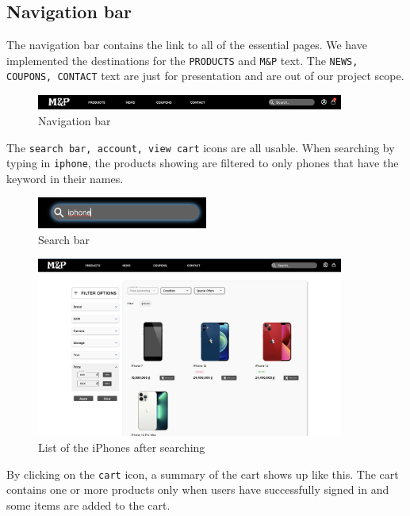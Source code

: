 \documentclass[a4paper]{article}
\numberwithin{equation}{section}
\begin{document}
\subsection{Navigation bar}

The navigation bar contains the link to all of the essential pages.
We have implemented the destinations for the {\tt PRODUCTS} and {\tt M\&P} text.
The {\tt NEWS, COUPONS, CONTACT} text are just for presentation and are out of our project scope.

\begin{figure}[H]
  \centering
  \includegraphics[width=0.9\textwidth]{assets/flow/navbar.png}
  \caption{Navigation bar}
\end{figure}

The {\tt search bar, account, view cart} icons are all usable.
When searching by typing in {\tt iphone}, the products showing are filtered to only phones that have the keyword in their names.
\begin{figure}[H]
  \centering
  \includegraphics[width=0.5\textwidth]{assets/flow/search.png}
  \caption{Search bar}
\end{figure}

\begin{figure}[H]
  \centering
  \includegraphics[width=0.9\textwidth]{assets/flow/iphone.png}
  \caption{List of the iPhones after searching}
\end{figure}

By clicking on the {\tt cart} icon, a summary of the cart shows up like this.
The cart contains one or more products only when users have successfully signed in and some items are added to the cart.
\end{document}
